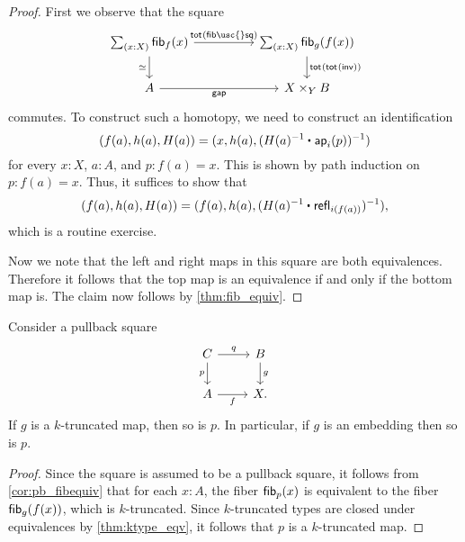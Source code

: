 \begin{proof}
First we observe that the square
\begin{equation*}
\begin{tikzcd}[column sep=huge]
\sm{x:X}\fib{f}{x} \arrow[d,swap,"\eqvsym"] \arrow[r,"\total{\mathsf{fib\usc{}sq}}"] &
\sm{x:X}\fib{g}{f(x)} \arrow[d,"\total{\total{\mathsf{inv}}}"] \\
A \arrow[r,swap,"\mathsf{gap}"] & X \times_Y B
\end{tikzcd}
\end{equation*}
commutes. To construct such a homotopy, we need to construct an identification
\begin{equation*}
(f(a),h(a),H(a))=(x,h(a),(\ct{H(a)^{-1}}{\ap{i}{p}})^{-1})
\end{equation*}
for every $x : X$, $a : A$, and $p : f(a) = x$. This is shown by path induction on $p : f(a)=x$. Thus, it suffices to show that
\begin{equation*}
(f(a),h(a),H(a))=(f(a),h(a),(\ct{H(a)^{-1}}{\refl{i(f(a))}})^{-1}),
\end{equation*}
which is a routine exercise. 

Now we note that the left and right maps in this square are both equivalences. Therefore it follows that the top map is an equivalence if and only if the bottom map is. The claim now follows by \cref{thm:fib_equiv}.
\end{proof}

\begin{cor}\label{cor:pb_trunc}
Consider a pullback square
\begin{equation*}
\begin{tikzcd}
C \arrow[r,"q"] \arrow[d,swap,"p"] & B \arrow[d,"g"] \\
A \arrow[r,swap,"f"] & X.
\end{tikzcd}
\end{equation*}
If $g$ is a $k$-truncated map, then so is $p$. In particular, if $g$ is an embedding then so is $p$.
\end{cor}

\begin{proof}
Since the square is assumed to be a pullback square, it follows from \cref{cor:pb_fibequiv} that for each $x:A$, the fiber $\mathsf{fib}_{p}(x)$ is equivalent to the fiber $\mathsf{fib}_{g}(f(x))$, which is $k$-truncated. Since $k$-truncated types are closed under equivalences by \cref{thm:ktype_eqv}, it follows that $p$ is a $k$-truncated map.
\end{proof}

